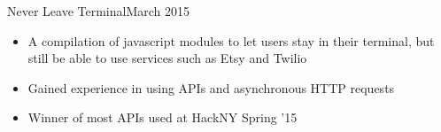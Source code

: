 \documentclass[11pt]{article}
\begin{document}

\headedsubsection
{Never Leave Terminal}{March 2015}
{
    \begin{itemize}[leftmargin=0.5in]
        \item{A compilation of javascript modules to let users stay in their terminal, but still be able to use services such as Etsy and Twilio}
        \item{Gained experience in using APIs and asynchronous HTTP requests}
        \item{Winner of most APIs used at HackNY Spring '15}
    \end{itemize}
}
\end{document}
